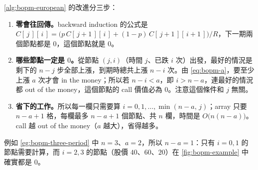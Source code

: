 \begin{remark}
	\autoref{alg:bopm-european} 的改進分三步：
	\begin{enumerate}[(1),nosep]
		\item \textbf{零會往回傳。}backward induction 的公式是 $C[\,j\,][\,i\,]=\bigl(p\,C[\,j+1\,][\,i\,]+(1-p)\,C[\,j+1\,][\,i+1\,]\bigr)/R$，下一期兩個節點都是 $0$，這個節點就是 $0$。
		\item \textbf{哪些節點一定是 $0$。}從節點 $(j,i)$（時間 $j$、已跌 $i$ 次）出發，最好的情況是剩下的 $n-j$ 步全部上漲，到期時總共上漲 $n-i$ 次。由 \eqref{eq:bopm-a}，要至少上漲 $a$ 次才會 in the money；所以若 $n-i<a$，即 $i>n-a$，連最好的情況都 out of the money，這個節點的 call 價值必為 $0$。注意這個條件和 $j$ 無關。
		\item \textbf{省下的工作。}所以每一欄只需要算 $i=0,1,\ldots,\min(n-a,\,j)$；array 只要 $n-a+1$ 格，每欄最多 $n-a+1$ 個節點、共 $n$ 欄，時間是 $O\bigl(n(n-a)\bigr)$。call 越 out of the money（$a$ 越大），省得越多。
	\end{enumerate}
	例如 \autoref{eg:bopm-three-period} 中 $n=3$、$a=2$，所以 $n-a=1$：只有 $i=0,1$ 的節點需要計算，而 $i=2,3$ 的節點（股價 $40$、$60$、$20$）在 \autoref{fig:bopm-example} 中確實都是 $0$。
\end{remark}
\suppend

